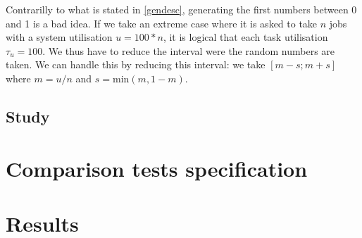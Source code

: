 \documentclass[a4paper]{article}
\begin{document}
Contrarilly to what is stated in \ref{gendesc}, generating the first numbers between 0 and 1 is a bad idea.
If we take an extreme case where it is asked to take $n$ jobs with a system utilisation $u = 100 * n$, it is logical that each task utilisation $\tau_u = 100$.
We thus have to reduce the interval were the random numbers are taken.
We can handle this by reducing this interval: we take $[m - s; m + s]$ where $m = u / n$ and $s = \text{min}(m, 1-m)$.


\subsection{Study}

\section{Comparison tests specification}

\section{Results}
\end{document}
